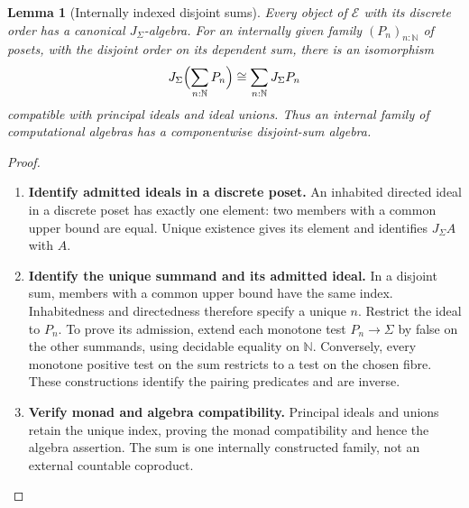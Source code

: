 \documentclass[11pt,a4paper]{article}
\numberwithin{algorithm}{section}
\numberwithin{equation}{section}
\newtheorem{lemma}[lemma]{Lemma}
\theoremstyle{definition}
\theoremstyle{remark}
\theoremstyle{plain}
\newcommand{\E}{\mathcal E}
\newcommand{\N}{\mathbb N}
\newcommand{\J}{J_{\Sigma}}
\theoremstyle{definition}
\theoremstyle{plain}
\begin{document}
\begin{lemma}[Internally indexed disjoint sums]\label{lem:word-sums}
Every object of $\E$ with its discrete order has a canonical $\J$-algebra.
For an internally given family $(P_n)_{n:\N}$ of posets, with the disjoint
order on its dependent sum, there is an isomorphism
\[
 \J\Bigl(\sum_{n:\N}P_n\Bigr)\cong\sum_{n:\N}\J P_n
\]
compatible with principal ideals and ideal unions. Thus an internal
family of computational algebras has a componentwise disjoint-sum algebra.
\end{lemma}
\begin{proof}\leavevmode
\begin{enumerate}[leftmargin=*,align=left]
\item \textbf{Identify admitted ideals in a discrete poset.}
An inhabited directed ideal in a discrete poset has exactly one element:
two members with a common upper bound are equal. Unique existence gives
its element and identifies $\J A$ with $A$.

\item \textbf{Identify the unique summand and its admitted ideal.}
In a disjoint sum, members with a common upper bound have the same index.
Inhabitedness and directedness therefore specify a unique $n$. Restrict
the ideal to $P_n$. To prove its admission, extend each monotone test
$P_n\to\Sigma$ by false on the other summands, using decidable equality
on $\N$. Conversely, every monotone positive test on the sum restricts
to a test on the chosen fibre. These constructions identify the pairing
predicates and are inverse.

\item \textbf{Verify monad and algebra compatibility.}
Principal ideals and unions retain the unique
index, proving the monad compatibility and hence the algebra assertion.
The sum is one internally constructed family, not an external countable
coproduct.
\end{enumerate}
\end{proof}
\end{document}

